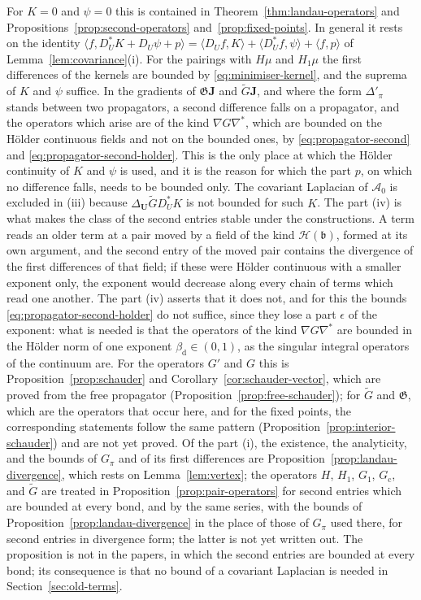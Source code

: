 \documentclass[11pt]{preprint}
\numberwithin{equation}{section}
\begin{document}
For $K = 0$ and $\psi = 0$ this is contained in Theorem~\ref{thm:landau-operators} and Propositions~\ref{prop:second-operators} and~\ref{prop:fixed-points}. In general it rests on the identity $\langle f, D^*_UK + D_U\psi + p\rangle = \langle D_Uf, K\rangle + \langle D^*_Uf, \psi\rangle + \langle f, p\rangle$ of Lemma~\ref{lem:covariance}(i). For the pairings with $H\mu$ and $H_1\mu$ the first differences of the kernels are bounded by \eqref{eq:minimiser-kernel}, and the suprema of $K$ and $\psi$ suffice. In the gradients of $\mathfrak G\mathbf J$ and $\tilde G\mathbf J$, and where the form $\Delta'_\pi$ stands between two propagators, a second difference falls on a propagator, and the operators which arise are of the kind $\nabla G\nabla^*$, which are bounded on the H\"older continuous fields and not on the bounded ones, by \eqref{eq:propagator-second} and \eqref{eq:propagator-second-holder}. This is the only place at which the H\"older continuity of $K$ and $\psi$ is used, and it is the reason for which the part $p$, on which no difference falls, needs to be bounded only. The covariant Laplacian of $\mathcal A_0$ is excluded in (iii) because $\Delta_{\mathbf U}\tilde GD^*_UK$ is not bounded for such $K$. The part (iv) is what makes the class of the second entries stable under the constructions. A term reads an older term at a pair moved by a field of the kind $\mathcal H(\mathfrak b)$, formed at its own argument, and the second entry of the moved pair contains the divergence of the first differences of that field; if these were H\"older continuous with a smaller exponent only, the exponent would decrease along every chain of terms which read one another. The part (iv) asserts that it does not, and for this the bounds \eqref{eq:propagator-second-holder} do not suffice, since they lose a part $\epsilon$ of the exponent: what is needed is that the operators of the kind $\nabla G\nabla^*$ are bounded in the H\"older norm of one exponent $\beta_{\mathrm d} \in (0, 1)$, as the singular integral operators of the continuum are. For the operators $G'$ and $G$ this is Proposition~\ref{prop:schauder} and Corollary~\ref{cor:schauder-vector}, which are proved from the free propagator (Proposition~\ref{prop:free-schauder}); for $\tilde G$ and $\mathfrak G$, which are the operators that occur here, and for the fixed points, the corresponding statements follow the same pattern (Proposition~\ref{prop:interior-schauder}) and are not yet proved. Of the part (i), the existence, the analyticity, and the bounds of $G_\pi$ and of its first differences are Proposition~\ref{prop:landau-divergence}, which rests on Lemma~\ref{lem:vertex}; the operators $H$, $H_1$, $G_1$, $G_{\mathrm c}$, and $\tilde G$ are treated in Proposition~\ref{prop:pair-operators} for second entries which are bounded at every bond, and by the same series, with the bounds of Proposition~\ref{prop:landau-divergence} in the place of those of $G_\pi$ used there, for second entries in divergence form; the latter is not yet written out. The proposition is not in the papers, in which the second entries are bounded at every bond; its consequence is that no bound of a covariant Laplacian is needed in Section~\ref{sec:old-terms}.
\end{document}
